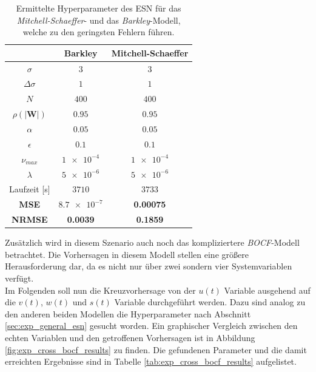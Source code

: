 \begin{table}[h]
	\centering
	\captionsetup{width=0.9\linewidth}
	\begin{tabular}{ccc}
		\hline		
		\multicolumn{1}{c}{} &  Barkley & Mitchell-Schaeffer \\ 
		\hline 
		\rule[-1ex]{0pt}{2.5ex} $\sigma$ & $3$ & $3$ \\ 
		\rule[-1ex]{0pt}{2.5ex} $\Delta \sigma$ & $1$ & $1$ \\ 
		\rule[-1ex]{0pt}{3.5ex} $N$ & $400$ & $400$ \\ 
		\rule[-1ex]{0pt}{3.5ex} $\rho(|\mathbf{W}|)$ & $0.95$ & $0.95$\\ 
		\rule[-1ex]{0pt}{3.5ex} $\alpha$ & $0.05$ & $0.05$ \\ 
		\rule[-1ex]{0pt}{3.5ex} $\epsilon$ & $0.1$ & $0.1$ \\ 
		\rule[-1ex]{0pt}{3.5ex} $\nu_{max}$ & $\num{1e-4}$ & $\num{1e-4}$\\ 
		\rule[-1ex]{0pt}{3.5ex} $\lambda$ & $\num{5e-6}$ & $\num{5e-6}$\\ 
		\rule[-1ex]{0pt}{2.5ex} Laufzeit [s] & $3710$ & $3733$ \\ 
		\rule[-1ex]{0pt}{2.5ex} \textbf{MSE} & \textbf{$\num{8.7e-7}$} & \textbf{0.00075} \\ 
		\rule[-1ex]{0pt}{2.5ex} \textbf{NRMSE} & \textbf{0.0039} & \textbf{0.1859} \\ 
		\hline 
	\end{tabular} 
	\caption{Ermittelte Hyperparameter des \textsc{ESN} für das \textit{Mitchell-Schaeffer}- und das \textit{Barkley}-Modell, welche zu den geringsten Fehlern führen.}
	\label{tab:exp_cross_esn_results}
\end{table}

Zusätzlich wird in diesem Szenario auch noch das kompliziertere \textit{BOCF}-Modell betrachtet. Die Vorhersagen in diesem Modell stellen eine größere Herausforderung dar, da es nicht nur über zwei sondern vier Systemvariablen verfügt.\\
Im Folgenden soll nun die Kreuzvorhersage von der $u(t)$ Variable ausgehend auf die $v(t)$, $w(t)$ und $s(t)$ Variable durchgeführt werden. Dazu sind analog zu den anderen beiden Modellen die Hyperparameter nach Abschnitt \ref{sec:exp_general_esn} gesucht worden. Ein graphischer Vergleich zwischen den echten Variablen und den getroffenen Vorhersagen ist in Abbildung \ref{fig:exp_cross_bocf_results} zu finden. Die gefundenen Parameter und die damit erreichten Ergebnisse sind in Tabelle \ref{tab:exp_cross_bocf_results} aufgelistet. \\

